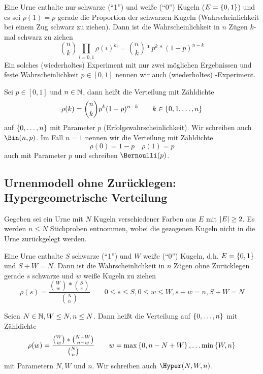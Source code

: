 \begin{beispiel}
	Eine Urne enthalte nur schwarze (``1'') und weiße (``0'') Kugeln ($E = \left\{ 0,1 \right\}$) und es sei $\rho(1) = p$ gerade die Proportion der schwarzen Kugeln (Wahrscheinlichkeit bei einem Zug schwarz zu ziehen). Dann ist die Wahrscheinlichkeit in $n$ Zügen $k$-mal schwarz zu ziehen
	\begin{equation*}
		\binom{n}{k} \prod_{i=0,1} \rho(i)^{k_i} = \binom{n}{k} *p^k * (1-p)^{n-k}
	\end{equation*}
	Ein solches (wiederholtes) Experiment mit nur zwei möglichen Ergebnissen und feste Wahrscheinlichkeit $p \in [0,1]$ nennen wir auch (wiederholtes) -Experiment.
\end{beispiel}

\begin{definition}
	Sei $p \in [0,1]$ und $n \in \mathbb{N}$, dann heißt die Verteilung mit Zähldichte
	\begin{equation*}
		\rho(k) = \binom{n}{k} p^k (1-p)^{n-k} \qquad k \in \left\{ 0, 1 , \dots , n \right\}
	\end{equation*}
	 auf $\left\{ 0, \dots, n \right\}$ mit Parameter $p$ (Erfolgswahrscheinlichkeit). Wir schreiben auch $\Bin(n,p)$. Im Fall $n=1$ nennen wir die Verteilung mit Zähldichte
	\begin{equation*}
		\rho(0) = 1-p \quad \rho(1) = p
	\end{equation*}
	auch  mit Parameter $p$ und schreiben $\Bernoulli(p)$.
\end{definition}

\subsection{Urnenmodell ohne Zurücklegen: Hypergeometrische Verteilung}
Gegeben sei ein Urne mit $N$ Kugeln verschiedener Farben aus $E$ mit $\left| E \right| \geq 2$. Es werden $n \leq N$ Stichproben entnommen, wobei die gezogenen Kugeln nicht in die Urne zurückgelegt werden.

\begin{beispiel}
	Eine Urne enthalte $S$ schwarze (``1'') und $W$ weiße (``0'') Kugeln, d.h. $E = \left\{ 0,1 \right\}$ und $S+W=N$. Dann ist die Wahrscheinlichkeit in $n$ Zügen ohne Zurücklegen gerade $s$ schwarze und $w$ weiße Kugeln zu ziehen
	\begin{equation*}
		\rho(s) = \frac{\binom{W}{w} * \binom{S}{s}}{\binom{N}{n}} \qquad 0 \leq s \leq S, 0 \leq w \leq W, s+w=n, S+W=N
	\end{equation*}
\end{beispiel}

\begin{definition}
	Seien $N \in \mathbb{N}, W \leq N, n \leq N$. Dann heißt die Verteilung auf $\left\{ 0, \dots , n \right\}$ mit Zähldichte 
	\begin{equation*}
		\rho(w) = \frac{\binom{W}{w} * \binom{N-W}{n-w}}{\binom{N}{n}} \qquad w = \max\left\{ 0 , n-N+W \right\} , \dots \min\left\{ W,n \right\}
	\end{equation*}
	 mit Parametern $N,W$ und $n$. Wir schreiben auch $\Hyper(N,W,n)$.
\end{definition}
